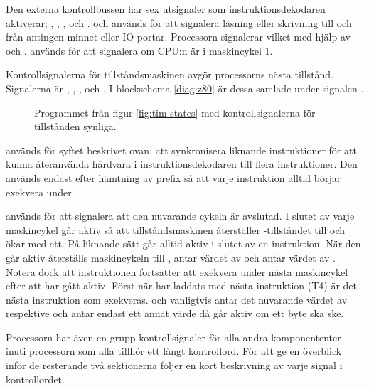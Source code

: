 \documentclass[main.tex]{subfiles}
\begin{document}
Den externa kontrollbussen har sex utsignaler som instruktionsdekodaren
aktiverar; , , ,  och .
 och  används för att signalera läsning eller skrivning till
och från antingen minnet eller IO-portar. Processorn signalerar vilket med
hjälp av  och .  används för att signalera om
CPU:n är i maskincykel 1.

Kontrollsignalerna för tillståndsmaskinen avgör processorns nästa tillstånd.
Signalerna är , , ,
 och . I blockschema \ref{diag:z80} är dessa
samlade under signalen .

\begin{figure}[H]
    \center
    
    \caption{Programmet från figur \ref{fig:tim-states} med kontrollsignalerna
    för tillstånden synliga.}
    \label{fig:tim-statectrl}
\end{figure}

 används för syftet beskrivet ovan; att synkronisera liknande
instruktioner för att kunna återanvända hårdvara i instruktionsdekodaren till
flera instruktioner. Den används endast efter hämtning av prefix så att varje
instruktion alltid börjar exekvera under 

 används för att signalera att den nuvarande cykeln är
avslutad. I slutet av varje maskincykel går  aktiv så att
tillståndsmaskinen återställer -tillståndet till  och ökar
 med ett. På liknande sätt går  alltid aktiv i slutet
av en instruktion. När den går aktiv återställs maskincykeln till ,
 antar värdet av  och  antar värdet av
. Notera dock att instruktionen fortsätter att exekvera under
nästa maskincykel efter att  har gått aktiv. Först när
 har laddats med nästa instruktion (T4) är det nästa instruktion som
exekveras.  och  vanligtvis antar det nuvarande
värdet av  respektive  och antar endast ett annat värde då
 går aktiv om ett byte ska ske.

Processorn har även en grupp kontrollsignaler för alla andra komponententer
inuti processorn som alla tillhör ett långt kontrollord. För att ge en
överblick inför de resterande två sektionerna följer en kort beskrivning av
varje signal i kontrollordet.
\end{document}
